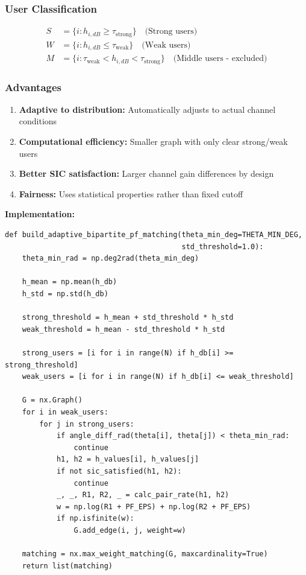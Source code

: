 \documentclass[12pt,a4paper]{article}
\begin{document}
\subsubsection{User Classification}

\begin{align}
S &= \{i : h_{i,dB} \geq \tau_{\text{strong}}\} \quad \text{(Strong users)} \\
W &= \{i : h_{i,dB} \leq \tau_{\text{weak}}\} \quad \text{(Weak users)} \\
M &= \{i : \tau_{\text{weak}} < h_{i,dB} < \tau_{\text{strong}}\} \quad \text{(Middle users - excluded)}
\end{align}

\subsubsection{Advantages}

\begin{enumerate}
    \item \textbf{Adaptive to distribution:} Automatically adjusts to actual channel conditions
    \item \textbf{Computational efficiency:} Smaller graph with only clear strong/weak users
    \item \textbf{Better SIC satisfaction:} Larger channel gain differences by design
    \item \textbf{Fairness:} Uses statistical properties rather than fixed cutoff
\end{enumerate}

\textbf{Implementation:}
\begin{lstlisting}[caption={Adaptive Bipartite PF Matching}]
def build_adaptive_bipartite_pf_matching(theta_min_deg=THETA_MIN_DEG, 
                                         std_threshold=1.0):
    theta_min_rad = np.deg2rad(theta_min_deg)
    
    h_mean = np.mean(h_db)
    h_std = np.std(h_db)
    
    strong_threshold = h_mean + std_threshold * h_std
    weak_threshold = h_mean - std_threshold * h_std
    
    strong_users = [i for i in range(N) if h_db[i] >= strong_threshold]
    weak_users = [i for i in range(N) if h_db[i] <= weak_threshold]
    
    G = nx.Graph()
    for i in weak_users:
        for j in strong_users:
            if angle_diff_rad(theta[i], theta[j]) < theta_min_rad:
                continue
            h1, h2 = h_values[i], h_values[j]
            if not sic_satisfied(h1, h2):
                continue
            _, _, R1, R2, _ = calc_pair_rate(h1, h2)
            w = np.log(R1 + PF_EPS) + np.log(R2 + PF_EPS)
            if np.isfinite(w):
                G.add_edge(i, j, weight=w)
    
    matching = nx.max_weight_matching(G, maxcardinality=True)
    return list(matching)
\end{lstlisting}
\end{document}
